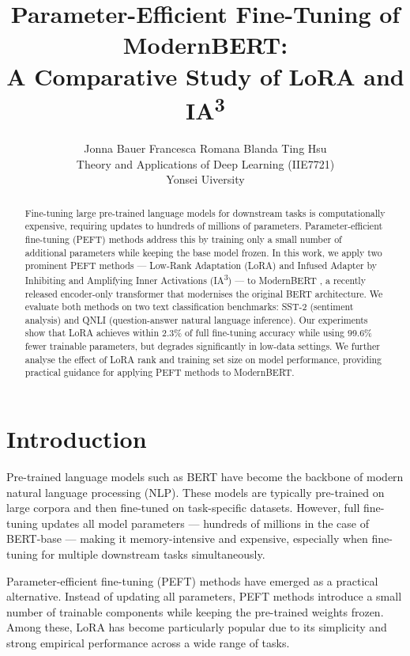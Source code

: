 \documentclass[11pt]{article}
\title{Parameter-Efficient Fine-Tuning of ModernBERT:\\
A Comparative Study of LoRA and IA\textsuperscript{3}}
\author{
  Jonna Bauer \quad Francesca Romana Blanda \quad Ting Hsu \\
  Theory and Applications of Deep Learning (IIE7721) \\
  Yonsei Uiversity \\
}
\begin{document}
\maketitle

\begin{abstract}
Fine-tuning large pre-trained language models for downstream tasks is
computationally expensive, requiring updates to hundreds of millions of
parameters. Parameter-efficient fine-tuning (PEFT) methods address this
by training only a small number of additional parameters while keeping
the base model frozen. In this work, we apply two prominent PEFT
methods --- Low-Rank Adaptation (LoRA) and Infused Adapter by Inhibiting
and Amplifying Inner Activations (IA\textsuperscript{3}) --- to
ModernBERT \cite{warner2024modernbert}, a recently released encoder-only
transformer that modernises the original BERT architecture. We evaluate
both methods on two text classification benchmarks: SST-2 (sentiment
analysis) and QNLI (question-answer natural language inference). Our
experiments show that LoRA achieves within 2.3\% of full fine-tuning
accuracy while using 99.6\% fewer trainable parameters, but degrades
significantly in low-data settings. We further analyse the effect of
LoRA rank and training set size on model performance, providing
practical guidance for applying PEFT methods to ModernBERT.
\end{abstract}

\section{Introduction}

Pre-trained language models such as BERT \cite{devlin2019bert} have
become the backbone of modern natural language processing (NLP). These
models are typically pre-trained on large corpora and then fine-tuned on
task-specific datasets. However, full fine-tuning updates all model
parameters --- hundreds of millions in the case of BERT-base --- making
it memory-intensive and expensive, especially when fine-tuning for
multiple downstream tasks simultaneously.

Parameter-efficient fine-tuning (PEFT) methods have emerged as a
practical alternative. Instead of updating all parameters, PEFT methods
introduce a small number of trainable components while keeping the
pre-trained weights frozen. Among these, LoRA \cite{hu2021lora} has
become particularly popular due to its simplicity and strong empirical
performance across a wide range of tasks.
\end{document}
